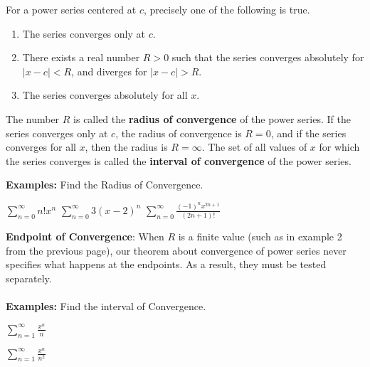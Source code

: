 \documentclass[addpoints, 12pt]{exam}
\begin{document}
\begin{tcolorbox}[title= CONVERGENCE OF A POWER SERIES,black,sharp corners,colback=white,colbacktitle=white,coltitle=black]

    For a power series centered at $c$, precisely one of the following is true.
    
    \begin{enumerate}
        \item The series converges only at $c$.
        \item There exists a real number $R>0$ such that the series converges absolutely for $|x-c|<R$, and diverges for $|x-c|>R$.
        \item The series converges absolutely for all $x$.
    \end{enumerate}
    The number $R$ is called the \textbf{radius of convergence} of the power series. If the series converges only at $c$, the radius of convergence is $R=0$, and if the series converges for all $x$, then the radius is $R=\infty$. The set of all values of $x$ for which the series converges is called the \textbf{interval of convergence} of the power series.

\end{tcolorbox}
\vspace{.1in}


\noindent\textbf{Examples:} Find the Radius of Convergence.
\begin{questions}
    \question $\displaystyle\sum_{n=0}^{\infty}n!x^n$
    \question $\displaystyle\sum_{n=0}^{\infty}3(x-2)^n$
    \question$\displaystyle\sum_{n=0}^{\infty}\frac{(-1)^n x^{2n+1}}{(2n+1)!}$
    

\end{questions}

\newpage


\noindent\textbf{Endpoint of Convergence}: When $R$ is a finite value (such as in example 2 from the previous page), our theorem about convergence of power series never specifies what happens at the endpoints. As a result, they must be tested separately.\\
\\
\noindent\textbf{Examples:} Find the interval of Convergence.
\begin{questions}
    \question $\displaystyle\sum_{n=1}^{\infty}\frac{x^n}{n}$
    
    \question$\displaystyle\sum_{n=1}^{\infty}\frac{x^n}{n^2}$
\end{questions}
\end{document}
